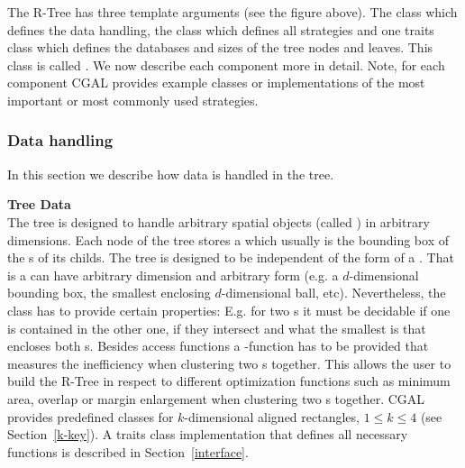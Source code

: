 The R-Tree has three template arguments (see the figure above). 
The 
class which defines the data handling, the 
class which defines all  strategies and one traits
class which defines the databases and sizes of the tree nodes and
leaves. This class is called . We now
describe each component more in detail. Note,
for
each component CGAL provides example classes or implementations
of the most important or most commonly used strategies.

\subsubsection{Data handling}
In this section we describe how data is handled in the tree.
\medskip

\noindent
{\bf Tree Data}\\
\noindent
The tree is designed to handle arbitrary spatial objects (called
) in arbitrary dimensions.
Each node of the tree stores a  which usually is the
bounding box of the s of its childs. The tree is designed to be
independent of the form of a . 
That is a  can have arbitrary dimension and arbitrary
form (e.g. a $d$-dimensional bounding box, the smallest enclosing
$d$-dimensional ball, etc). Nevertheless, the  class has
to provide certain properties: 
E.g. for two s it must be decidable if one  is contained in
the other one, if they intersect and what the smallest 
is that encloses both s.
Besides access functions a -function has to be provided
that measures the inefficiency when clustering two s
together. This allows the user to build the R-Tree in respect to
different optimization functions such as minimum area, overlap or
margin enlargement when clustering two s together.
CGAL provides predefined
 classes for $k$-dimensional aligned rectangles, $1\le k\le
4$ (see Section~\ref{k-key}). 
A traits class implementation that defines all necessary functions is
described in Section~\ref{interface}. 
\medskip

